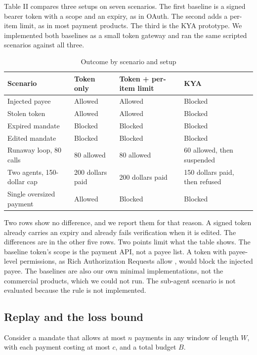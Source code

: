 \documentclass[conference]{IEEEtran}
\begin{document}
Table II compares three setups on seven scenarios. The first baseline is a signed bearer token with a scope and an expiry, as in OAuth. The second adds a per-item limit, as in most payment products. The third is the KYA prototype. We implemented both baselines as a small token gateway and ran the same scripted scenarios against all three.

\begin{table}[t]
\caption{Outcome by scenario and setup}
\centering\footnotesize
\begin{tabularx}{\columnwidth}{@{}>{\raggedright\arraybackslash}p{}YYY@{}}
\toprule
\textbf{Scenario} & \textbf{Token only} & \textbf{Token + per-item limit} & \textbf{KYA} \\
\midrule
Injected payee & Allowed & Allowed & Blocked \\
Stolen token & Allowed & Allowed & Blocked \\
Expired mandate & Blocked & Blocked & Blocked \\
Edited mandate & Blocked & Blocked & Blocked \\
Runaway loop, 80 calls & 80 allowed & 80 allowed & 60 allowed, then suspended \\
Two agents, 150-dollar cap & 200 dollars paid & 200 dollars paid & 150 dollars paid, then refused \\
Single oversized payment & Allowed & Blocked & Blocked \\
\bottomrule
\end{tabularx}
\end{table}

Two rows show no difference, and we report them for that reason. A signed token already carries an expiry and already fails verification when it is edited. The differences are in the other five rows. Two points limit what the table shows. The baseline token's scope is the payment API, not a payee list. A token with payee-level permissions, as Rich Authorization Requests allow \cite{b13}, would block the injected payee. The baselines are also our own minimal implementations, not the commercial products, which we could not run. The sub-agent scenario is not evaluated because the rule is not implemented.

\subsection{Replay and the loss bound}

Consider a mandate that allows at most $n$ payments in any window of length $W$, with each payment costing at most $c$, and a total budget $B$.
\end{document}
